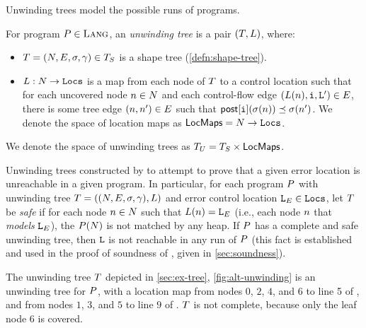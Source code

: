 Unwinding trees model the possible runs of programs.
\begin{defn}
  \label{defn:unwinding-tree}
  For program $P \in \textsc{Lang}$, an \emph{unwinding tree} is a pair
  $(T, L)$, where:
  \begin{itemize}
  \item
    $T = (N, E, \sigma, \gamma) \in
    T_S$ is a shape tree (\autoref{defn:shape-tree}).
  \item
    $L: N \to \mathtt{Locs}$ is a map from each node of
    $T$ to a control location such that for each uncovered
    node $n \in N$ and each control-flow edge $(L(n),
    \mathtt{i}, \mathtt{L}') \in E$, there is some tree edge $(n, n')
    \in E$ such that $\mathsf{post}[\mathtt{i}](\sigma(n)) \preceq
    \sigma(n')$.
    We denote the space of location maps as $\mathsf{LocMaps} = N \to
    \mathtt{Locs}$.
  \end{itemize}
  We denote the space of unwinding trees as $T_U =
  T_S \times \mathsf{LocMaps}$.
\end{defn}

Unwinding trees constructed by \verifier to attempt to prove that a
given error location is unreachable in a given program.
%
In particular, for each program $P$ with unwinding tree $T
= ((N, E, \sigma, \gamma), L)$ and error
control location $\mathtt{L}_E \in \mathtt{Locs}$, let $T$ be \emph{safe} if
for each node $n \in N$ such that $L(n) =
\mathtt{L}_E$ (i.e., each node $n$ that \emph{models} $\mathtt{L}_E$), the
$P(N)$ is not matched by any heap.
%
If $P$ has a complete and safe unwinding tree, then $\mathtt{L}$ is
not reachable in any run of $P$ (this fact is established and
used in the proof of soundness of \verifier, given in
\autoref{sec:soundness}).

\begin{ex}
  \label{ex:altlist-unwinding}
  The unwinding tree $T$ depicted in \autoref{sec:ex-tree},
  \autoref{fig:alt-unwinding} is an unwinding tree for $P$, with
  a location map from nodes $0$, $2$, $4$, and $6$ to line 5 of
  \altlist, and from nodes $1$, $3$, and $5$ to line $9$ of \altlist.
  $T$ is not complete, because only the leaf node $6$ is
  covered.
\end{ex}

